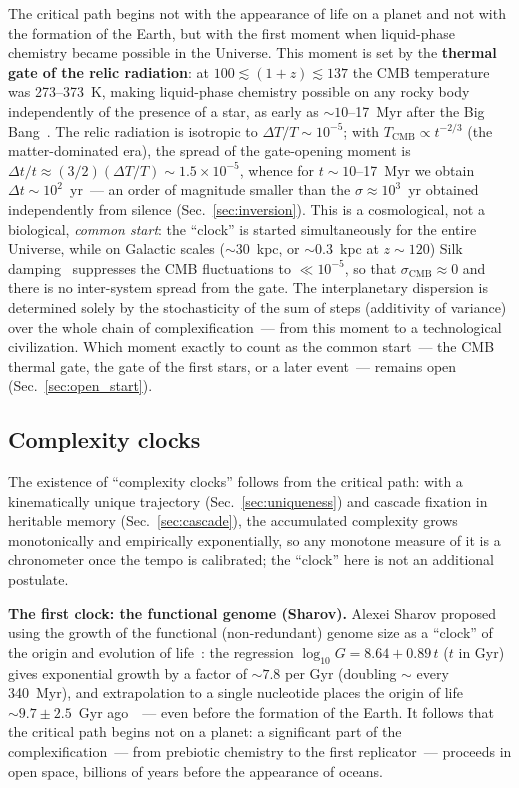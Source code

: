 \documentclass[11pt,a4paper]{article}
\begin{document}
The critical path begins not with the appearance of life on a planet and not with the formation of the Earth, but with the first moment when liquid-phase chemistry became possible in the Universe. This moment is set by the \textbf{thermal gate of the relic radiation}: at $100 \lesssim (1+z) \lesssim 137$ the CMB temperature was 273--373~K, making liquid-phase chemistry possible on any rocky body independently of the presence of a star, as early as $\sim 10$--17~Myr after the Big Bang~\cite{Loeb2014}. The relic radiation is isotropic to $\Delta T/T \sim 10^{-5}$; with $T_{\mathrm{CMB}} \propto t^{-2/3}$ (the matter-dominated era), the spread of the gate-opening moment is $\Delta t/t \approx (3/2)(\Delta T/T) \sim 1.5 \times 10^{-5}$, whence for $t \sim 10$--17~Myr we obtain $\Delta t \sim 10^2$~yr~--- an order of magnitude smaller than the $\sigma \approx 10^3$~yr obtained independently from silence (Sec.~\ref{sec:inversion}). This is a cosmological, not a biological, \emph{common start}: the ``clock'' is started simultaneously for the entire Universe, while on Galactic scales ($\sim 30$~kpc, or $\sim 0.3$~kpc at $z\sim 120$) Silk damping~\cite{Silk1968} suppresses the CMB fluctuations to $\ll 10^{-5}$, so that $\sigma_{\mathrm{CMB}} \approx 0$ and there is no inter-system spread from the gate. The interplanetary dispersion is determined solely by the stochasticity of the sum of steps (additivity of variance) over the whole chain of complexification~--- from this moment to a technological civilization. Which moment exactly to count as the common start~--- the CMB thermal gate, the gate of the first stars, or a later event~--- remains open (Sec.~\ref{sec:open_start}).

\subsection{Complexity clocks}
\label{sec:complexity_clocks}

The existence of ``complexity clocks'' follows from the critical path: with a kinematically unique trajectory (Sec.~\ref{sec:uniqueness}) and cascade fixation in heritable memory (Sec.~\ref{sec:cascade}), the accumulated complexity grows monotonically and empirically exponentially, so any monotone measure of it is a chronometer once the tempo is calibrated; the ``clock'' here is not an additional postulate.

\textbf{The first clock: the functional genome (Sharov).} Alexei Sharov proposed using the growth of the functional (non-redundant) genome size as a ``clock'' of the origin and evolution of life~\cite{Sharov}: the regression $\log_{10}G = 8.64 + 0.89\,t$ ($t$ in Gyr) gives exponential growth by a factor of $\sim 7.8$ per Gyr (doubling $\sim$ every 340~Myr), and extrapolation to a single nucleotide places the origin of life $\sim 9.7 \pm 2.5$~Gyr ago~\cite{Sharov2013}~--- even before the formation of the Earth. It follows that the critical path begins not on a planet: a significant part of the complexification~--- from prebiotic chemistry to the first replicator~--- proceeds in open space, billions of years before the appearance of oceans.
\end{document}
